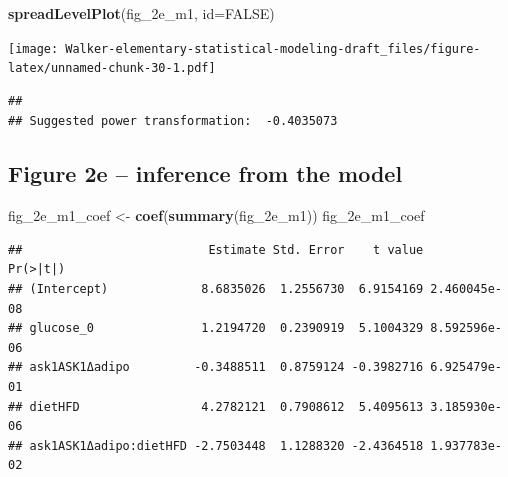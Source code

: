 \documentclass[]{book}
\newenvironment{Shaded}{\begin{snugshade}}{\end{snugshade}}
\newcommand{\DataTypeTok}[1]{\textcolor[rgb]{0.13,0.29,0.53}{#1}}
\newcommand{\KeywordTok}[1]{\textcolor[rgb]{0.13,0.29,0.53}{\textbf{#1}}}
\newcommand{\NormalTok}[1]{#1}
\newcommand{\OperatorTok}[1]{\textcolor[rgb]{0.81,0.36,0.00}{\textbf{#1}}}
\newcommand{\OtherTok}[1]{\textcolor[rgb]{0.56,0.35,0.01}{#1}}
\newcommand{\StringTok}[1]{\textcolor[rgb]{0.31,0.60,0.02}{#1}}
\begin{document}
\begin{Shaded}
\begin{Highlighting}[]
\KeywordTok{spreadLevelPlot}\NormalTok{(fig_2e_m1, }\DataTypeTok{id=}\OtherTok{FALSE}\NormalTok{)}
\end{Highlighting}
\end{Shaded}

\texttt{[image: Walker-elementary-statistical-modeling-draft\_files/figure-latex/unnamed-chunk-30-1.pdf]}

\begin{verbatim}
## 
## Suggested power transformation:  -0.4035073
\end{verbatim}

\hypertarget{figure-2e-inference-from-the-model}{%
\subsection{Figure 2e -- inference from the model}\label{figure-2e-inference-from-the-model}}

\begin{Shaded}
\begin{Highlighting}[]
\NormalTok{fig_2e_m1_coef <-}\StringTok{ }\KeywordTok{coef}\NormalTok{(}\KeywordTok{summary}\NormalTok{(fig_2e_m1))}
\NormalTok{fig_2e_m1_coef}
\end{Highlighting}
\end{Shaded}

\begin{verbatim}
##                          Estimate Std. Error    t value     Pr(>|t|)
## (Intercept)             8.6835026  1.2556730  6.9154169 2.460045e-08
## glucose_0               1.2194720  0.2390919  5.1004329 8.592596e-06
## ask1ASK1Δadipo         -0.3488511  0.8759124 -0.3982716 6.925479e-01
## dietHFD                 4.2782121  0.7908612  5.4095613 3.185930e-06
## ask1ASK1Δadipo:dietHFD -2.7503448  1.1288320 -2.4364518 1.937783e-02
\end{verbatim}

\begin{Shaded}
\end{Shaded}
\end{document}
